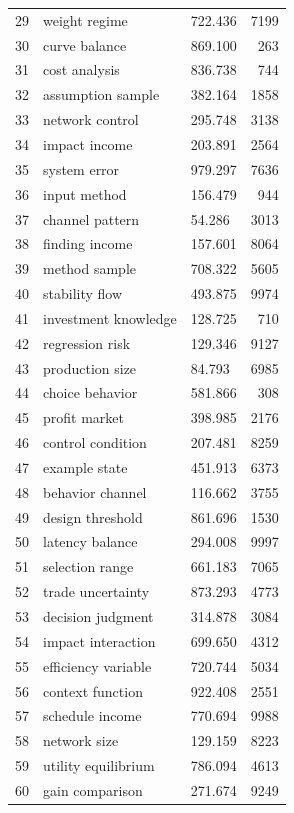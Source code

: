 \documentclass[11pt]{report}
\begin{document}
\begin{longtable}{rllr}
29 & weight regime & 722.436 & 7199 \\
30 & curve balance & 869.100 & 263 \\
31 & cost analysis & 836.738 & 744 \\
32 & assumption sample & 382.164 & 1858 \\
33 & network control & 295.748 & 3138 \\
34 & impact income & 203.891 & 2564 \\
35 & system error & 979.297 & 7636 \\
36 & input method & 156.479 & 944 \\
37 & channel pattern & 54.286 & 3013 \\
38 & finding income & 157.601 & 8064 \\
39 & method sample & 708.322 & 5605 \\
40 & stability flow & 493.875 & 9974 \\
41 & investment knowledge & 128.725 & 710 \\
42 & regression risk & 129.346 & 9127 \\
43 & production size & 84.793 & 6985 \\
44 & choice behavior & 581.866 & 308 \\
45 & profit market & 398.985 & 2176 \\
46 & control condition & 207.481 & 8259 \\
47 & example state & 451.913 & 6373 \\
48 & behavior channel & 116.662 & 3755 \\
49 & design threshold & 861.696 & 1530 \\
50 & latency balance & 294.008 & 9997 \\
51 & selection range & 661.183 & 7065 \\
52 & trade uncertainty & 873.293 & 4773 \\
53 & decision judgment & 314.878 & 3084 \\
54 & impact interaction & 699.650 & 4312 \\
55 & efficiency variable & 720.744 & 5034 \\
56 & context function & 922.408 & 2551 \\
57 & schedule income & 770.694 & 9988 \\
58 & network size & 129.159 & 8223 \\
59 & utility equilibrium & 786.094 & 4613 \\
60 & gain comparison & 271.674 & 9249 \\
\end{longtable}
\end{document}
